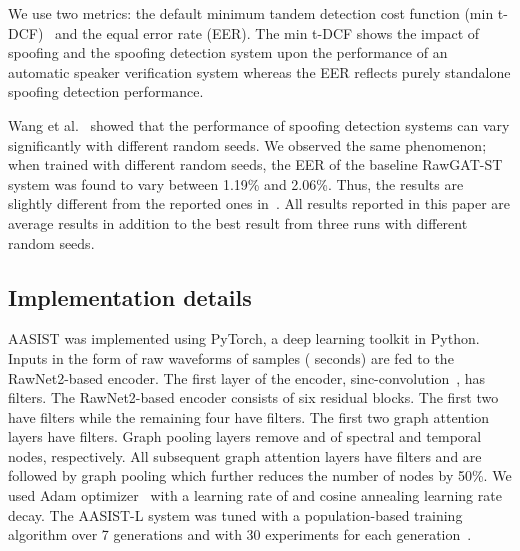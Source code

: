 \documentclass{article}
\begin{document}
We use two metrics: the default minimum tandem detection cost function (min t-DCF)~\cite{Kinnunen2018tdcf} and the equal error rate (EER). 
The min t-DCF shows the impact of spoofing and the spoofing detection system upon the performance of an automatic speaker verification system whereas the EER  
reflects purely standalone spoofing detection performance. 

Wang et al.~\cite{wang21fa_interspeech} showed that the performance of spoofing detection systems can vary significantly with different random seeds. 
We observed the same phenomenon; when trained with different random seeds, the EER of the baseline  RawGAT-ST~\cite{tak2021end} system was found to vary between 1.19\% and 2.06\%. 
Thus, the results are slightly different from the reported ones in~\cite{tak2021end}. 
All results reported in this paper are average results in addition to the best result from three runs with different random seeds. 

\subsection{Implementation details}
\label{ssec:implementation}
AASIST was implemented using PyTorch, a deep learning toolkit in Python. 
Inputs in the form of raw waveforms of  samples ( seconds) are fed to the RawNet2-based encoder. 
The first layer of the encoder, sinc-convolution~\cite{ravanelli2018speaker}, has  filters. 
The RawNet2-based encoder consists of six residual blocks. 
The first two have  filters while the remaining four have  filters. 
The first two graph attention layers have  filters. 
Graph pooling layers remove  and  of spectral and temporal nodes, respectively. 
All subsequent graph attention layers have  filters and are followed by graph pooling which further reduces the number of nodes by 50\%.
We used Adam optimizer~\cite{Kingma2015adam} with a learning rate of   and cosine annealing learning rate decay. 
The AASIST-L system was tuned with a population-based training algorithm over 7 generations and with 30 experiments for each generation~\cite{jaderberg2017population}.
\end{document}
